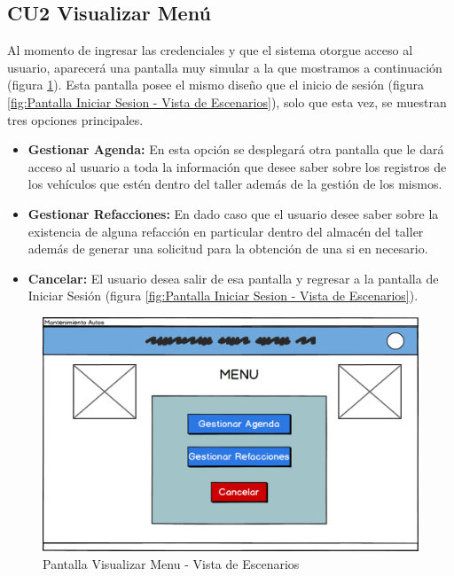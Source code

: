 \subsection{CU2 Visualizar Menú}
Al momento de ingresar las credenciales y que el sistema otorgue acceso al usuario, aparecerá una pantalla muy simular a la que mostramos a continuación (figura \ref{fig:Pantalla Visualizar Menu - Vista de Escenarios}). Esta pantalla posee el mismo diseño que el inicio de sesión (figura \ref{fig:Pantalla Iniciar Sesion - Vista de Escenarios}), solo que esta vez, se muestran tres opciones principales. 
\begin{itemize}
	\item \textbf{Gestionar Agenda:} En esta opción se desplegará otra pantalla que le dará acceso al usuario a toda la información que desee saber sobre los registros de los vehículos que estén dentro del taller además de la gestión de los mismos.
	\item \textbf{Gestionar Refacciones:} En dado caso que el usuario desee saber sobre la existencia de alguna refacción en particular dentro del almacén del taller además de generar una solicitud para la obtención de una si en necesario.
	\item \textbf{Cancelar:} El usuario desea salir de esa pantalla y regresar a la pantalla de Iniciar Sesión (figura \ref{fig:Pantalla Iniciar Sesion - Vista de Escenarios}).
\end{itemize}
\begin{figure}[!h]
	\centering
	\includegraphics[width=1\textwidth]{./diseno/vescenarios/imagenes/VisualizarMenu}
	\caption{Pantalla Visualizar Menu - Vista de Escenarios}
	\label{fig:Pantalla Visualizar Menu - Vista de Escenarios}
\end{figure}
\clearpage

